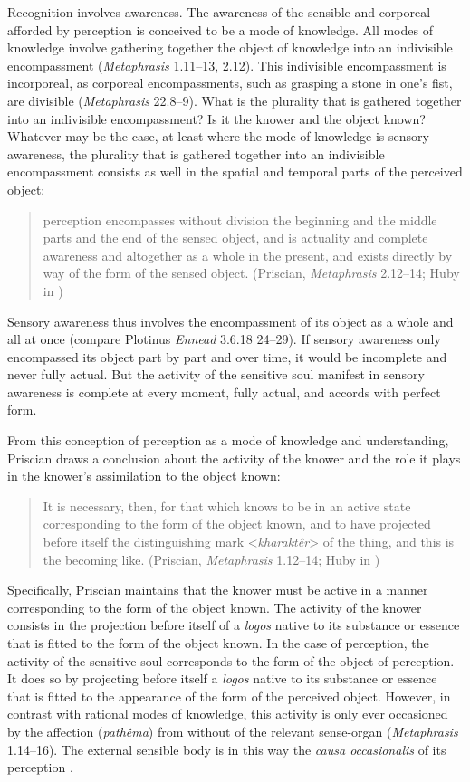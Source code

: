 \documentclass[12pt]{article}
\begin{document}
Recognition involves awareness. The awareness of the sensible and corporeal afforded by perception is conceived to be a mode of knowledge. All modes of knowledge involve gathering together the object of knowledge into an indivisible encompassment (\emph{Metaphrasis} 1.11--13, 2.12). This indivisible encompassment is incorporeal, as corporeal encompassments, such as grasping a stone in one's fist, are divisible (\emph{Metaphrasis} 22.8--9). What is the plurality that is gathered together into an indivisible encompassment? Is it the knower and the object known? Whatever may be the case, at least where the mode of knowledge is sensory awareness, the plurality that is gathered together into an indivisible encompassment consists as well in the spatial and temporal parts of the perceived object:
\begin{quote}
	perception encompasses without division the beginning and the middle parts and the end of the sensed object, and is actuality and complete awareness and altogether as a whole in the present, and exists directly by way of the form of the sensed object. (Priscian, \emph{Metaphrasis} 2.12--14; Huby in \citealt{Sorabji:1997ly})
\end{quote}
Sensory awareness thus involves the encompassment of its object as a whole and all at once (compare Plotinus \emph{Ennead} 3.6.18 24--29). If sensory awareness only encompassed its object part by part and over time, it would be incomplete and never fully actual. But the activity of the sensitive soul manifest in sensory awareness is complete at every moment, fully actual, and accords with perfect form.

From this conception of perception as a mode of knowledge and understanding, Priscian draws a conclusion about the activity of the knower and the role it plays in the knower's assimilation to the object known: 
\begin{quote}
	It is necessary, then, for that which knows to be in an active state corresponding to the form of the object known, and to have projected before itself the distinguishing mark <\emph{kharaktêr}> of the thing, and this is the becoming like. (Priscian, \emph{Metaphrasis} 1.12--14; Huby in \citealt[9]{Sorabji:1997ly})
\end{quote}
Specifically, Priscian maintains that the knower must be active in a manner corresponding to the form of the object known. The activity of the knower consists in the projection before itself of a \emph{logos} native to its substance or essence that is fitted to the form of the object known. In the case of perception, the activity of the sensitive soul corresponds to the form of the object of perception. It does so by projecting before itself a \emph{logos} native to its substance or essence that is fitted to the appearance of the form of the perceived object. However, in contrast with rational modes of knowledge, this activity is only ever occasioned by the affection (\emph{pathêma}) from without of the relevant sense-organ (\emph{Metaphrasis} 1.14--16). The external sensible body is in this way the \emph{causa occasionalis} of its perception \citep[112]{Lautner:1994cs}.
\end{document}
